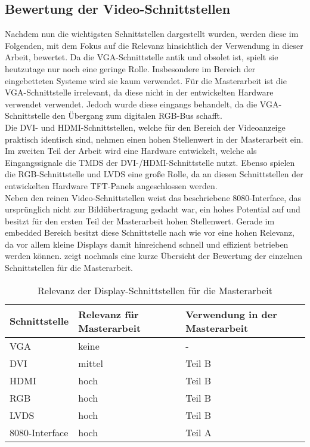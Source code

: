\subsection{Bewertung der Video-Schnittstellen}
\label{cha:bewertung_video}
Nachdem nun die wichtigsten Schnittstellen dargestellt wurden, werden diese im Folgenden, mit dem Fokus auf die Relevanz hinsichtlich der Verwendung in dieser Arbeit, bewertet.
Da die VGA-Schnittstelle antik und obsolet ist, spielt sie heutzutage nur noch eine geringe Rolle. Insbesondere im Bereich der eingebetteten Systeme wird sie kaum verwendet. Für die Masterarbeit ist die VGA-Schnittstelle irrelevant, da diese nicht in der entwickelten Hardware verwendet verwendet. Jedoch wurde diese eingangs behandelt, da die VGA-Schnittstelle den Übergang zum digitalen RGB-Bus schafft.\\
Die DVI- und HDMI-Schnittstellen, welche für den Bereich der Videoanzeige praktisch identisch sind, nehmen einen hohen Stellenwert in der Masterarbeit ein. Im zweiten Teil der Arbeit wird eine Hardware entwickelt, welche als Eingangssignale die TMDS der DVI-/HDMI-Schnittstelle nutzt. 
Ebenso spielen die RGB-Schnittstelle und LVDS eine große Rolle, da an diesen Schnittstellen der entwickelten Hardware TFT-Panels angeschlossen werden. \\
Neben den reinen Video-Schnittstellen weist das beschriebene 8080-Interface, das ursprünglich nicht zur Bildübertragung gedacht war, ein hohes Potential auf und besitzt für den ersten Teil der Masterarbeit hohen Stellenwert. Gerade im embedded Bereich besitzt diese Schnittstelle nach wie vor eine hohen Relevanz, da vor allem kleine Displays damit hinreichend schnell und effizient betrieben werden können.  zeigt nochmals eine kurze Übersicht der Bewertung der einzelnen Schnittstellen für die Masterarbeit.

\begin{table}[h]
\begin{tabular}{|p{3cm}|p{5cm}|p{4.5cm}|}\hline
\rowcolor{TableBackgroundColor}
   \textbf{Schnittstelle} 	& \textbf{Relevanz für Masterarbeit} 	& \textbf{Verwendung in der Masterarbeit}	\\ \hline
   VGA 						& keine  								& - 	 									\\ \hline
   DVI 						& mittel 								& Teil B 									\\ \hline
   HDMI						& hoch 									& Teil B 									\\ \hline
   RGB 						& hoch 									& Teil B 									\\ \hline
   LVDS 					& hoch									& Teil B 									\\ \hline
   8080-Interface 			& hoch 									& Teil A 									\\ \hline
\end{tabular}
\caption{Relevanz der Display-Schnittstellen für die Masterarbeit}
\label{tab:interface_vergleich}
\end{table}

